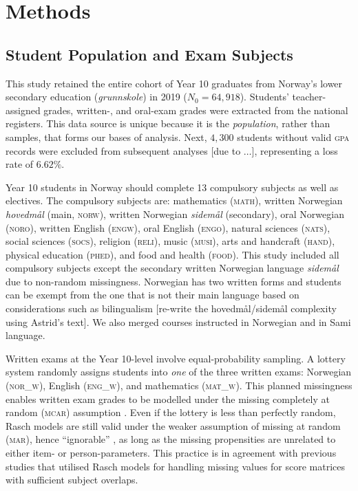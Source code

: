 \newpage
\section{Methods}

\subsection{Student Population and Exam Subjects}

This study retained the entire cohort of Year 10 graduates from Norway's lower secondary education (\textit{grunnskole}) in 2019 ($N_0 = 64,918$). Students' teacher-assigned grades, written-, and oral-exam grades were extracted from the national registers. This data source is unique because it is the \emph{population}, rather than samples, that forms our bases of analysis. Next, $4,300$ students without valid \textsc{gpa} records were excluded from subsequent analyses [due to $\dots$], representing a loss rate of $6.62\%$.

Year 10 students in Norway should complete 13 compulsory subjects as well as electives. The compulsory subjects are: mathematics (\textsc{math}), written Norwegian \textit{hovedm{\aa}l} (main, \textsc{norw}), written Norwegian \textit{sidem{\aa}l} (secondary), oral Norwegian (\textsc{noro}), written English (\textsc{engw}), oral English (\textsc{engo}), natural sciences (\textsc{nats}), social sciences (\textsc{socs}), religion (\textsc{reli}), music (\textsc{musi}), arts and handcraft (\textsc{hand}), physical education (\textsc{phed}), and food and health (\textsc{food}). This study included all compulsory subjects except the secondary written Norwegian language \textit{sidem{\aa}l} due to non-random missingness. Norwegian has two written forms and students can be exempt from the one that is not their main language based on considerations such as bilingualism [re-write the hovedm{\aa}l/sidem{\aa}l complexity using Astrid's text]. We also merged courses instructed in Norwegian and in Sami language.

Written exams at the Year 10-level involve equal-probability sampling. A lottery system randomly assigns students into \emph{one} of the three written exams: Norwegian (\textsc{nor\_w}),  English (\textsc{eng\_w}), and mathematics (\textsc{mat\_w}). This planned missingness enables written exam grades to be modelled under the missing completely at random (\textsc{mcar}) assumption \parencite{little:2019}. Even if the lottery is less than perfectly random, Rasch models are still valid under the weaker assumption of missing at random (\textsc{mar}), hence ``ignorable'' \parencite{molenaar:1995}, as long as the missing propensities are unrelated to either item- or person-parameters. This practice is in agreement with previous studies \parencite[e.g., ][]{he:2018} that utilised Rasch models for handling missing values for score matrices with sufficient subject overlaps.

